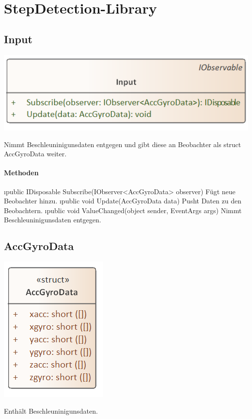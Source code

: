 \documentclass[../entwurf.tex]{subfiles}
\begin{document}
\section{StepDetection-Library}
    \subsection{Input}
        
        \begin{center}
            \includegraphics[scale=0.75]{../uml_klassen/StepDetectionLib/Input.png}
        \end{center}
        Nimmt Beschleuninigunsdaten entgegen und gibt diese an Beobachter als struct AccGyroData weiter.
        \paragraph{Methoden}
        \begin{itemize}
            \i{public IDisposable Subscribe(IObserver<AccGyroData> observer)} Fügt neue Beobachter hinzu.
            \i{public void Update(AccGyroData data)} Pusht Daten zu den Beobachtern.
            \i{public void ValueChanged(object sender, EventArgs args)} Nimmt Beschleuninigunsdaten entgegen.
        \end{itemize}


    \subsection{AccGyroData}
    	
    	\begin{minipage}{0.4\textwidth}
    		 \includegraphics[scale=0.75]{../uml_klassen/StepDetectionLib/AccGyroData.png}
    	\end{minipage}
    	\begin{minipage}{0.6\textwidth}
    		
        	Enthält Beschleuninigunsdaten.
    	\end{minipage}
\end{document}
